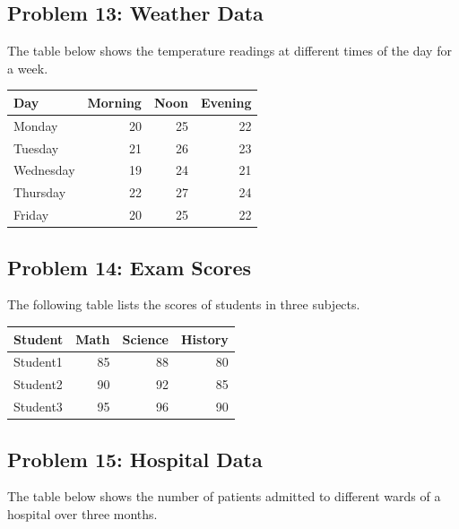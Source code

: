 \documentclass[
  letterpaper,
  DIV=11,
  numbers=noendperiod]{scrreprt}
\begin{document}
\subsection*{Problem 13: Weather Data}\label{problem-13-weather-data}

The table below shows the temperature readings at different times of the
day for a week.

\begin{table}
\centering
\begin{tabular}{l|r|r|r}
\hline
Day & Morning & Noon & Evening\\
\hline
Monday & 20 & 25 & 22\\
\hline
Tuesday & 21 & 26 & 23\\
\hline
Wednesday & 19 & 24 & 21\\
\hline
Thursday & 22 & 27 & 24\\
\hline
Friday & 20 & 25 & 22\\
\hline
\end{tabular}
\end{table}

\subsection*{Problem 14: Exam Scores}\label{problem-14-exam-scores}

The following table lists the scores of students in three subjects.

\begin{table}
\centering
\begin{tabular}{l|r|r|r}
\hline
Student & Math & Science & History\\
\hline
Student1 & 85 & 88 & 80\\
\hline
Student2 & 90 & 92 & 85\\
\hline
Student3 & 95 & 96 & 90\\
\hline
\end{tabular}
\end{table}

\subsection*{Problem 15: Hospital Data}\label{problem-15-hospital-data}

The table below shows the number of patients admitted to different wards
of a hospital over three months.
\end{document}
